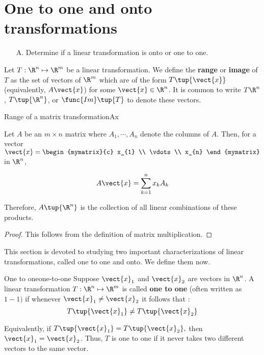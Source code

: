 \section{One to one and onto transformations}

\begin{outcome}
\begin{enumerate}
\item[A.]  Determine if a linear transformation is onto or one to one.
\end{enumerate}
\end{outcome}

Let $T: \R^n \mapsto \R^m$ be a linear transformation. We define the \textbf{range} or \textbf{image} of $T$ as the set of vectors of $\R^{m}$ which are of the form
$T \tup{\vect{x}}$ (equivalently, $A\vect{x}$) for some $\vect{x}\in \R^{n}$. It is common
to write $T\R^{n}$, $T\tup{\R^{n}}$, or
$\func{Im}\tup{T} $ to denote these vectors.  

\begin{lemma}{Range of a matrix transformation}{Ax}

Let $A$ be an $m\times n$ matrix where $A_{1},\cdots , A_{n}$ denote the columns of
$A$. Then, for a vector $\vect{x}=\begin{mymatrix}{c}
x_{1} \\
\vdots \\
 x_{n}
\end{mymatrix}$ in $\R^n$,

\begin{equation*}
A\vect{x}=\sum_{k=1}^{n}x_{k}A_{k}
\end{equation*}

Therefore, $A \tup{\R^n }$ is the collection of all
linear combinations of these products.
\end{lemma}

\begin{proof}
This follows from the definition of matrix multiplication.
\end{proof}

This section is devoted to studying two important characterizations of linear transformations, called one to one and onto. We define them now. 

\begin{definition}{One to one}{one-to-one}
Suppose $\vect{x}_1$ and $\vect{x}_2$ are vectors in $\R^n$. A linear transformation $T: \R^n \mapsto \R^m$ is called \textbf{one to one} (often written as $1-1)$ if whenever
 $\vect{x}_1 \neq \vect{x}_2$ it follows that :
\begin{equation*}
T\tup{\vect{x}_1 } \neq T \tup{\vect{x}_2}
\end{equation*}

Equivalently, if $T\tup{\vect{x}_1 } =T\tup{\vect{x}_2} ,$
then $\vect{x}_1 = \vect{x}_2$. Thus,  $T$ is one to one if it never takes two different
vectors to the same vector.
\end{definition}

